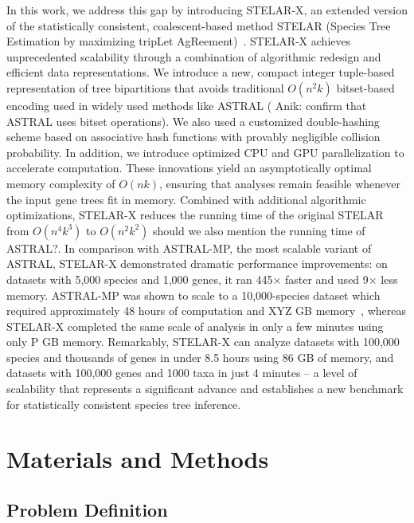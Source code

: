 \documentclass[10pt,a4paper]{article}
\newcommand{\addr}[1]{{\color{red} #1}}
\begin{document}
In this work, we address this gap by introducing STELAR-X, an extended version of the statistically consistent, coalescent-based method STELAR (Species Tree Estimation by maximizing tripLet AgReement)~\cite{stelar}. STELAR-X achieves unprecedented scalability through a combination of algorithmic redesign and efficient data representations. 
We introduce a new, compact integer tuple-based representation of tree bipartitions that avoids traditional $O(n^2k)$ bitset-based encoding used in widely used methods like ASTRAL (\addr{Anik: confirm that ASTRAL uses bitset operations}). We also used a customized double-hashing scheme based on associative hash functions with provably negligible collision probability. In addition, we introduce optimized CPU and GPU parallelization to accelerate computation. These innovations yield an asymptotically optimal memory complexity of $O(nk)$, ensuring that analyses remain feasible whenever the input gene trees fit in memory. 
Combined with additional algorithmic optimizations, STELAR-X reduces the running time of the original STELAR from $O(n^4k^3)$ to $O(n^2k^2)$ \addr{should we also mention the running time of ASTRAL?}. In  comparison with ASTRAL-MP, the most scalable variant of ASTRAL, STELAR-X demonstrated dramatic performance improvements: on datasets with 5,000 species and 1,000 genes, it ran 445× faster and used 9× less memory. ASTRAL-MP was shown to scale to a 10,000-species dataset which required approximately 48 hours of computation and \addr{XYZ GB memory}~\cite{astral-mp}, whereas STELAR-X completed the same scale of analysis in only a few minutes using only \addr{P GB memory}. Remarkably, STELAR-X can analyze datasets with 100,000 species and thousands of genes in under 8.5 hours using 86 GB of memory, and datasets with 100,000 genes and 1000 taxa in just 4 minutes -- a level of scalability that represents a significant advance and establishes a new benchmark for statistically consistent species tree inference.


\section{Materials and Methods}

\subsection{Problem Definition}
\end{document}
